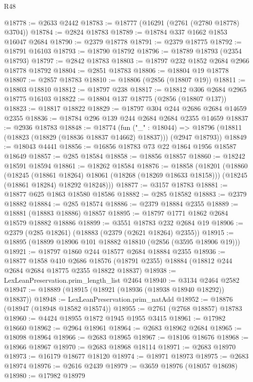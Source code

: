 \begin{lexlean}{R48}
\begin{coremodule}
@18778 := @2633 @2442
@18783 := @18777 (@16291 (@2761 (@2780 @18778) @3704))
@18784 := @2824 @18783
@18789 := @18784 @337 @1662 @1853 @16047 @2684
@18790 := @2379 @18778
@18791 := @2379 @18775
@18792 := @18791 @16103
@18793 := @18790 @18792
@18796 := @18789 @18793 (@2354 @18793)
@18797 := @2842 @18783
@18803 := @18797 @232 @1852 @2684 @2966 @18778 @18792
@18804 := @2851 @18783
@18806 := @18804 @19 @18778
@18807 := @2857 @18783
@18810 := @18806 (@2856 (@18807 @19))
@18811 := @18803 @18810
@18812 := @18797 @238
@18817 := @18812 @306 @2684 @2965 @18775 @16103
@18822 := @18804 @137 @18775 (@2856 (@18807 @137))
@18823 := @18817 @18822
@18829 := @18797 @304 @244 @2686 @2684 @14659 @2355
@18836 := @18784 @296 @139 @244 @2684 @2684 @2355 @14659
@18837 := @2936 @18783
@18848 := @18774
    (fun ("_" : @18044) =>
    @18796 (@18811 (@18823 (@18829 (@18836 @18837 @14662) @18837))) (@2947 @18793))
@18849 := @18043 @4441
@18856 := @16856 @18783 @73 @22 @1864 @1956 @18587 @18649
@18857 := @285 @18584
@18858 := @18856 @18857
@18860 := @18242 @18591 @18594
@18861 := @18262 @18584
@18876 := @18858
    (@18201
      (@18860
        (@18245 (@18861 @18264) @18061 (@18268 (@18269 @18633 @18158)))
        (@18245 (@18861 @18284) @18292 @18248)))
@18877 := @3157 @18783
@18881 := @18877 @625 @1863 @18580 @18586
@18882 := @285 @18582
@18883 := @2379 @18882
@18884 := @285 @18574
@18886 := @2379 @18884 @2355
@18889 := @18881 (@18883 @18886) @18857
@18895 := @18797 @1771 @1862 @2684 @18579 @18882 @18886
@18899 := @3551 @18783 @232 @2684 @19
@18906 := @2379 (@285 @18261) (@18883 (@2379 (@2621 @18264) @2355))
@18915 := @18895 (@18899 @18906 @101 @18882 @18810 (@2856 (@3595 @18906 @19)))
@18921 := @18797 @1860 @244 @18577 @2684 @18884 @2355
@18936 := @18877
    @1858
    @410
    @2686
    @18576
    (@18791 @2355)
    @18884
    (@18812 @244 @2684 @2684 @18775 @2355 @18822 @18837)
@18938 := LexLeanPreservation.prim_length_list @2464
@18940 := @3134 @2464 @2582
@18947 := @18889 (@18915 (@18921 (@18936 (@18938 @18940 @18292)) @18837))
@18948 := LexLeanPreservation.prim_natAdd
@18952 := @18876 (@18947 (@18948 @18582 @18574))
@18955 := @2761 (@2768 @18857) @18783
@18960 := @4424 @18955 @1872 @1945 @1955 @3415
@18961 := @17982 @18660
@18962 := @2964 @18961
@18964 := @2683 @18962 @2684
@18965 := @18098 @18964
@18966 := @2683 @18965
@18967 := @18106 @18676
@18968 := @18966 @18967
@18970 := @2683 @18968 @18114
@18971 := @2683 @18970
@18973 := @16179 @18677 @18120
@18974 := @18971 @18973
@18975 := @2683 @18974
@18976 := @2616 @2439
@18979 := @3659 @18976 (@18057 @18698)
@18980 := @17982 @18979

\end{coremodule}
\end{lexlean}
